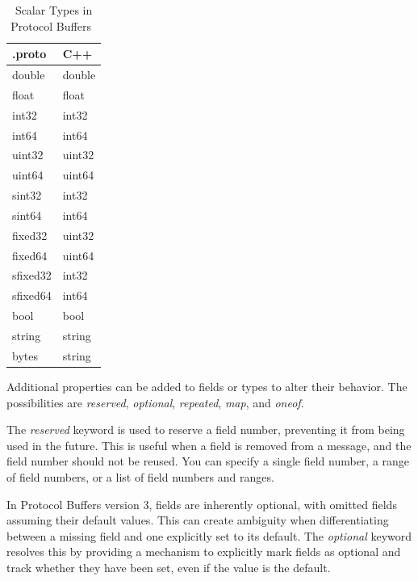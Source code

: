 \begin{table}[hbt!]
    \centering
    \captionsetup{justification=centering}
    \begin{tabular}{|l|l|}
        \hline
        .proto   & C++    \\ \hline
        double   & double \\ \hline
        float    & float  \\ \hline
        int32    & int32  \\ \hline
        int64    & int64  \\ \hline
        uint32   & uint32 \\ \hline
        uint64   & uint64 \\ \hline
        sint32   & int32  \\ \hline
        sint64   & int64  \\ \hline
        fixed32  & uint32 \\ \hline
        fixed64  & uint64 \\ \hline
        sfixed32 & int32  \\ \hline
        sfixed64 & int64  \\ \hline
        bool     & bool   \\ \hline
        string   & string \\ \hline
        bytes    & string \\ \hline
    \end{tabular}
    \caption{Scalar Types in Protocol Buffers~\cite{protobuf-proto3}}
    \label{tab:protobuf-scalar-types}
\end{table}


Additional properties can be added to fields or types to alter their behavior.
The possibilities are \textit{reserved}, \textit{optional}, \textit{repeated}, \textit{map}, and \textit{oneof}.
\cite{protobuf-proto3}

The \textit{reserved} keyword is used to reserve a field number, preventing it from being used in the future.
This is useful when a field is removed from a message, and the field number should not be reused.
You can specify a single field number, a range of field numbers, or a list of field numbers and ranges.
\cite{protobuf-proto3}

In Protocol Buffers version 3, fields are inherently optional, with omitted fields assuming their default values.
This can create ambiguity when differentiating between a missing field and one explicitly set to its default.
The \textit{optional} keyword resolves this by providing a mechanism to explicitly mark fields as optional and track whether they have been set, even if the value is the default.
\cite{protobuf-proto3}

